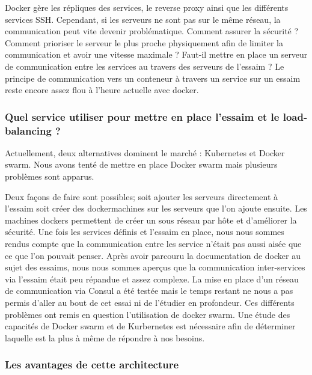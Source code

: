 \par Docker gère les répliques des services, le reverse proxy ainsi que les différents services SSH. Cependant, si les serveurs ne sont pas sur le même réseau, la communication peut vite devenir problématique. Comment assurer la sécurité ? Comment prioriser le serveur le plus proche physiquement afin de limiter la communication et avoir une vitesse maximale ? Faut-il mettre en place un serveur de communication entre les services au travers des serveurs de l’essaim ? Le principe de communication vers un conteneur à travers un service sur un essaim reste encore assez flou à l’heure actuelle avec docker. 

	\subsubsection{Quel service utiliser pour mettre en place l’essaim et le load-balancing ?}

\par Actuellement, deux alternatives dominent le marché : Kubernetes et Docker swarm. Nous avons tenté de mettre en place Docker swarm mais plusieurs problèmes sont apparus. \\

\par Deux façons de faire sont possibles; soit ajouter les serveurs directement à l’essaim soit créer des \gls{dockermachine}s sur les serveurs que l’on ajoute ensuite. Les machines dockers permettent de créer un sous réseau par hôte et d’améliorer la sécurité. Une fois les services définis et l’essaim en place, nous nous sommes rendus compte que la communication entre les service n’était pas aussi aisée que ce que l’on pouvait penser. Après avoir parcouru la documentation de docker au sujet des essaims, nous nous sommes aperçus que la communication inter-services via l’\gls{essaim} était peu répandue et assez complexe. La mise en place d’un réseau de communication via Consul a été testée mais le temps restant ne nous a pas permis d’aller au bout de cet essai ni de l’étudier en profondeur. Ces différents problèmes ont remis en question l’utilisation de docker swarm. Une étude des capacités de Docker swarm et de Kurbernetes est nécessaire afin de déterminer laquelle est la plus à même de répondre à nos besoins.

\subsubsection{Les avantages de cette architecture}

